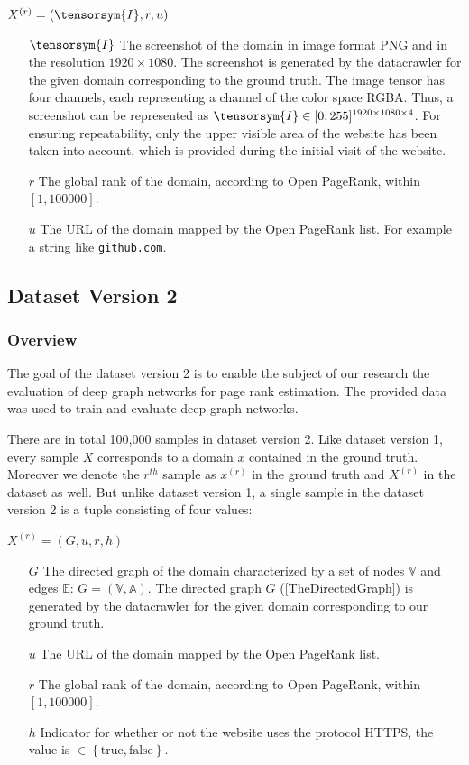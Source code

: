 \begin{center}
 $X^{(r)} = (\tensorsym{I}, r, u)$
\begin{itemize}
	\item[$\tensorsym{I}$] The screenshot of the domain in image format PNG and in the resolution $1920\times1080$. The screenshot is generated by the datacrawler for the given domain corresponding to the ground truth. The image tensor has four channels, each representing a channel of the color space RGBA. Thus, a screenshot can be represented as $\tensorsym{I}\in[0,255]^{1920\times1080\times4}$. For ensuring repeatability, only the upper visible area of the website has been taken into account, which is provided during the initial visit of the website. 
	\item[$r$] The global rank of the domain, according to Open PageRank, within $[1, 100000]$. 
	\item[$u$] The URL of the domain mapped by the Open PageRank list. For example a string like \texttt{github.com}.
\end{itemize}
\end{center}

\subsection{Dataset Version 2}
\label{DatasetVersion2}
\subsubsection{Overview}
The goal of the dataset version 2 is to enable the subject of our research the evaluation of deep graph networks for page rank estimation. The provided data was used to train and evaluate deep graph networks.

There are in total 100,000 samples in dataset version 2. Like dataset version 1, every sample $X$ corresponds to a domain $x$ contained in the ground truth. Moreover we denote the $r^{th}$ sample as $x^{(r)}$ in the ground truth and $X^{(r)}$ in the dataset as well. 
But unlike dataset version 1, a single sample in the dataset version 2 is a tuple consisting of four values:

\begin{center}
$X^{(r)} = (G,u,r,h)$
\begin{itemize}
    \item[$G$] The directed graph of the domain characterized by a set of nodes $\mathbb{V}$ and edges $\mathbb{E}$: $G= \left(\mathbb{V}, \mathbb{A}\right)$. The directed graph $G$ (\ref{TheDirectedGraph}) is generated by the datacrawler for the given domain corresponding to our ground truth.
	\item[$u$] The URL of the domain mapped by the Open PageRank list.
	\item[$r$] The global rank of the domain, according to Open PageRank, within $[1, 100000]$. 
    \item[$h$] Indicator for whether or not the website uses the protocol HTTPS, the value is $\in\left\{\text{true}, \text{false}\right\}$.
\end{itemize}
\end{center}

